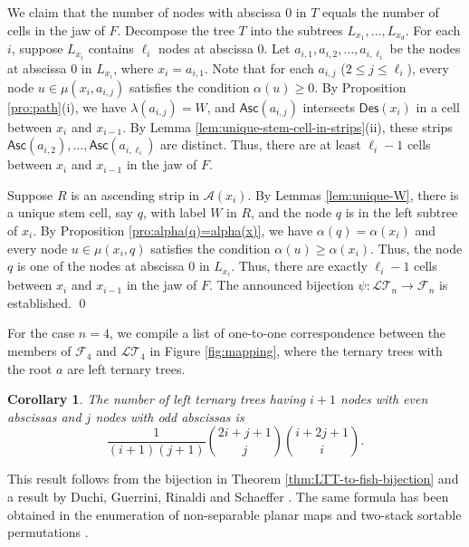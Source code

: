 \documentclass[a4paper,11pt,reqno]{amsart}
\newtheorem{cor}[lem]{Corollary}
\theoremstyle{definition}
\numberwithin{equation}{section}
\newcommand{\A}{{\mathcal{A}}}
\newcommand{\Des}{{\textsf{Des}}}
\newcommand{\Asc}{{\textsf{Asc}}}
\newcommand{\LT}{{\mathcal{LT}}}
\newcommand{\F}{{\mathcal{F}}}
\begin{document}
We claim that the number of nodes with abscissa 0 in $T$ equals the number of cells in the jaw of $F$. Decompose the tree $T$ into the subtrees $L_{x_1},\dots,L_{x_d}$. For each $i$, suppose $L_{x_i}$ contains $\ell_i$ nodes at abscissa 0.
Let $a_{i,1}, a_{i,2}, \dots, a_{i,\ell_i}$ be the nodes at abscissa 0 in $L_{x_i}$, where $x_i=a_{i,1}$. Note that for each $a_{i,j}$ ($2\le j\le \ell_i$), every node $u\in\mu(x_i, a_{i,j})$ satisfies the condition $\alpha(u)\ge 0$. By Proposition \ref{pro:path}(i), we have $\lambda(a_{i,j})=W$, and $\Asc(a_{i,j})$ intersects $\Des(x_i)$ in a cell between $x_i$ and $x_{i-1}$. By Lemma \ref{lem:unique-stem-cell-in-strips}(ii), these strips $\Asc(a_{i,2}),\dots,\Asc(a_{i,\ell_i})$ are distinct.
Thus, there are at least $\ell_i-1$ cells between $x_i$ and $x_{i-1}$ in the jaw of $F$. 

Suppose $R$ is an ascending strip in $\A(x_i)$. By Lemmas \ref{lem:unique-W}, there is a unique stem cell, say $q$, with label $W$ in $R$, and the node $q$ is in the left subtree of $x_i$. By Proposition \ref{pro:alpha(q)=alpha(x)}, we have $\alpha(q)=\alpha(x_i)$ and every node $u\in\mu(x_i,q)$ satisfies the condition $\alpha(u)\ge\alpha(x_i)$. Thus, the node $q$ is one of the nodes at abscissa 0 in $L_{x_i}$. Thus, there are exactly $\ell_i-1$ cells between $x_i$ and $x_{i-1}$ in the jaw of $F$. The announced bijection $\psi:\LT_n\rightarrow\F_n$ is established.
\qed


\medskip
For the case $n=4$, we compile a list of one-to-one correspondence between the members of $\F_4$ and $\LT_4$ in Figure \ref{fig:mapping}, where the ternary trees with the root $a$ are left ternary trees.


\begin{cor} The number of left ternary trees having $i+1$ nodes with even abscissas and $j$ nodes with odd abscissas is 
\begin{equation}
\frac{1}{(i+1)(j+1)}\binom{2i+j+1}{j}\binom{i+2j+1}{i}.
\end{equation}
\end{cor}

This result follows from the bijection in Theorem \ref{thm:LTT-to-fish-bijection} and a result by Duchi, Guerrini, Rinaldi and Schaeffer \cite[Theorem 2]{DGRS-B}. The same formula has been obtained in the enumeration of non-separable planar maps \cite{Brown-Tutte} and two-stack sortable permutations \cite{GW-1996, JS-1998}.
\end{document}
